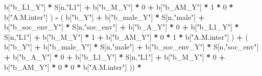 \documentclass[
]{book}
\newenvironment{Shaded}{\begin{snugshade}}{\end{snugshade}}
\newcommand{\DecValTok}[1]{\textcolor[rgb]{0.00,0.00,0.81}{#1}}
\newcommand{\NormalTok}[1]{#1}
\newcommand{\SpecialCharTok}[1]{\textcolor[rgb]{0.81,0.36,0.00}{\textbf{#1}}}
\newcommand{\StringTok}[1]{\textcolor[rgb]{0.31,0.60,0.02}{#1}}
\begin{document}
\begin{Shaded}
\begin{Highlighting}[]
\NormalTok{                                 b[}\StringTok{"b\_L1\_Y"}\NormalTok{] }\SpecialCharTok{*}\NormalTok{ S[n,}\StringTok{"L1"}\NormalTok{] }\SpecialCharTok{+}
\NormalTok{                                 b[}\StringTok{"b\_M\_Y"}\NormalTok{] }\SpecialCharTok{*} \DecValTok{0} \SpecialCharTok{+}
\NormalTok{                                 b[}\StringTok{"b\_AM\_Y"}\NormalTok{] }\SpecialCharTok{*} \DecValTok{1} \SpecialCharTok{*} \DecValTok{0} \SpecialCharTok{*}\NormalTok{ b[}\StringTok{"A.M.inter"}\NormalTok{] ) }\SpecialCharTok{{-}} 
\NormalTok{                             ( b[}\StringTok{"b\_Y"}\NormalTok{] }\SpecialCharTok{+} 
\NormalTok{                                 b[}\StringTok{"b\_male\_Y"}\NormalTok{] }\SpecialCharTok{*}\NormalTok{ S[n,}\StringTok{"male"}\NormalTok{] }\SpecialCharTok{+} 
\NormalTok{                                 b[}\StringTok{"b\_soc\_env\_Y"}\NormalTok{] }\SpecialCharTok{*}\NormalTok{ S[n,}\StringTok{"soc\_env"}\NormalTok{] }\SpecialCharTok{+} 
\NormalTok{                                 b[}\StringTok{"b\_A\_Y"}\NormalTok{] }\SpecialCharTok{*} \DecValTok{0} \SpecialCharTok{+} 
\NormalTok{                                 b[}\StringTok{"b\_L1\_Y"}\NormalTok{] }\SpecialCharTok{*}\NormalTok{ S[n,}\StringTok{"L1"}\NormalTok{] }\SpecialCharTok{+}
\NormalTok{                                 b[}\StringTok{"b\_M\_Y"}\NormalTok{] }\SpecialCharTok{*} \DecValTok{1} \SpecialCharTok{+}
\NormalTok{                                 b[}\StringTok{"b\_AM\_Y"}\NormalTok{] }\SpecialCharTok{*} \DecValTok{0} \SpecialCharTok{*} \DecValTok{1} \SpecialCharTok{*}\NormalTok{ b[}\StringTok{"A.M.inter"}\NormalTok{] ) }\SpecialCharTok{+} 
\NormalTok{                             ( b[}\StringTok{"b\_Y"}\NormalTok{] }\SpecialCharTok{+} 
\NormalTok{                                 b[}\StringTok{"b\_male\_Y"}\NormalTok{] }\SpecialCharTok{*}\NormalTok{ S[n,}\StringTok{"male"}\NormalTok{] }\SpecialCharTok{+} 
\NormalTok{                                 b[}\StringTok{"b\_soc\_env\_Y"}\NormalTok{] }\SpecialCharTok{*}\NormalTok{ S[n,}\StringTok{"soc\_env"}\NormalTok{] }\SpecialCharTok{+} 
\NormalTok{                                 b[}\StringTok{"b\_A\_Y"}\NormalTok{] }\SpecialCharTok{*} \DecValTok{0} \SpecialCharTok{+} 
\NormalTok{                                 b[}\StringTok{"b\_L1\_Y"}\NormalTok{] }\SpecialCharTok{*}\NormalTok{ S[n,}\StringTok{"L1"}\NormalTok{] }\SpecialCharTok{+}
\NormalTok{                                 b[}\StringTok{"b\_M\_Y"}\NormalTok{] }\SpecialCharTok{*} \DecValTok{0} \SpecialCharTok{+}
\NormalTok{                                 b[}\StringTok{"b\_AM\_Y"}\NormalTok{] }\SpecialCharTok{*} \DecValTok{0} \SpecialCharTok{*} \DecValTok{0} \SpecialCharTok{*}\NormalTok{ b[}\StringTok{"A.M.inter"}\NormalTok{] )) }\SpecialCharTok{*}

\end{Highlighting}
\end{Shaded}
\end{document}

